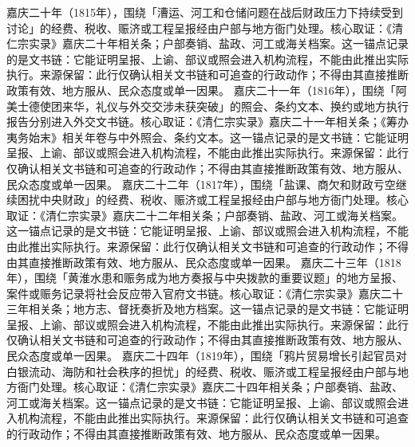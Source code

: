 嘉庆二十年（1815年），围绕「漕运、河工和仓储问题在战后财政压力下持续受到讨论」的经费、税收、赈济或工程呈报经由户部与地方衙门处理。核心取证：《清仁宗实录》嘉庆二十年相关条；户部奏销、盐政、河工或海关档案。这一锚点记录的是文书链：它能证明呈报、上谕、部议或照会进入机构流程，不能由此推出实际执行。来源保留：此行仅确认相关文书链和可追查的行政动作；不得由其直接推断政策有效、地方服从、民众态度或单一因果。
嘉庆二十一年（1816年），围绕「阿美士德使团来华，礼仪与外交交涉未获突破」的照会、条约文本、换约或地方执行报告分别进入外交文书链。核心取证：《清仁宗实录》嘉庆二十一年相关条；《筹办夷务始末》相关年卷与中外照会、条约文本。这一锚点记录的是文书链：它能证明呈报、上谕、部议或照会进入机构流程，不能由此推出实际执行。来源保留：此行仅确认相关文书链和可追查的行政动作；不得由其直接推断政策有效、地方服从、民众态度或单一因果。
嘉庆二十二年（1817年），围绕「盐课、商欠和财政亏空继续困扰中央财政」的经费、税收、赈济或工程呈报经由户部与地方衙门处理。核心取证：《清仁宗实录》嘉庆二十二年相关条；户部奏销、盐政、河工或海关档案。这一锚点记录的是文书链：它能证明呈报、上谕、部议或照会进入机构流程，不能由此推出实际执行。来源保留：此行仅确认相关文书链和可追查的行政动作；不得由其直接推断政策有效、地方服从、民众态度或单一因果。
嘉庆二十三年（1818年），围绕「黄淮水患和赈务成为地方奏报与中央拨款的重要议题」的地方呈报、案件或赈务记录将社会反应带入官府文书链。核心取证：《清仁宗实录》嘉庆二十三年相关条；地方志、督抚奏折及地方档案。这一锚点记录的是文书链：它能证明呈报、上谕、部议或照会进入机构流程，不能由此推出实际执行。来源保留：此行仅确认相关文书链和可追查的行政动作；不得由其直接推断政策有效、地方服从、民众态度或单一因果。
嘉庆二十四年（1819年），围绕「鸦片贸易增长引起官员对白银流动、海防和社会秩序的担忧」的经费、税收、赈济或工程呈报经由户部与地方衙门处理。核心取证：《清仁宗实录》嘉庆二十四年相关条；户部奏销、盐政、河工或海关档案。这一锚点记录的是文书链：它能证明呈报、上谕、部议或照会进入机构流程，不能由此推出实际执行。来源保留：此行仅确认相关文书链和可追查的行政动作；不得由其直接推断政策有效、地方服从、民众态度或单一因果。
